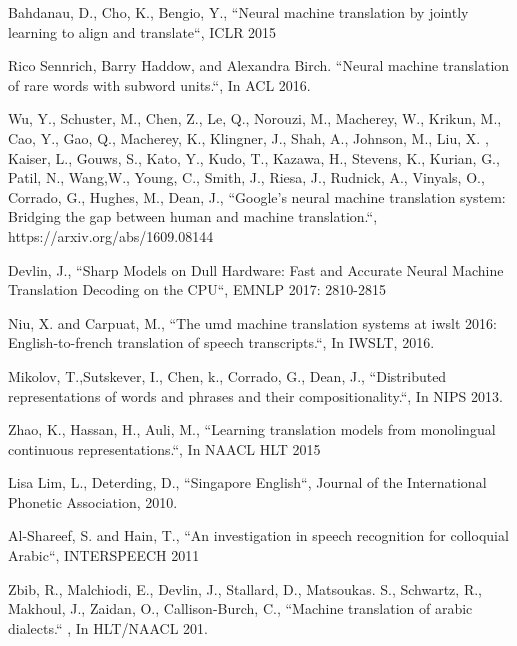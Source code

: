 \documentclass[a4paper]{article}
\begin{document}

\begin{thebibliography}{30}

 Bahdanau, D., Cho, K., Bengio, Y.,  ``Neural machine translation by jointly learning to align and
  translate``, ICLR 2015

Rico Sennrich, Barry Haddow, and Alexandra Birch.
``Neural machine translation of rare words with subword units.``,
 In ACL 2016.

 Wu, Y., Schuster, M., Chen, Z., Le, Q., Norouzi, M., Macherey, W., Krikun, M., Cao, Y., Gao, Q., Macherey, K., Klingner, J.,
  Shah, A.,  Johnson, M., Liu, X. , Kaiser, L.,  Gouws, S.,
   Kato, Y., Kudo, T., Kazawa, H., Stevens, K., Kurian, G., Patil, N., Wang,W., Young, C., Smith, J., Riesa, J., Rudnick, A.,
   Vinyals, O., Corrado, G., Hughes, M.,  Dean, J.,
 ``Google's neural machine translation system: Bridging the gap between
  human and machine translation.``, https://arxiv.org/abs/1609.08144

Devlin, J., 	``Sharp Models on Dull Hardware: Fast and Accurate Neural Machine Translation Decoding on the CPU``, EMNLP 2017: 2810-2815

 Niu, X. and Carpuat, M.,
``The umd machine translation systems at iwslt 2016: English-to-french
  translation of speech transcripts.``, In  IWSLT, 2016.

 Mikolov, T.,Sutskever, I., Chen, k., Corrado, G.,  Dean, J.,
  ``Distributed representations of words and phrases and their
  compositionality.``, In  NIPS 2013. 


 Zhao, K., Hassan, H., Auli, M., 
``Learning translation models from monolingual continuous representations.``, In NAACL HLT 2015

Lisa Lim, L., Deterding, D., ``Singapore English``,   Journal of the International Phonetic Association, 2010.

  Al{-}Shareef, S. and Hain, T.,  ``An investigation in speech recognition for colloquial Arabic``, INTERSPEECH 2011


 Zbib, R., Malchiodi, E., Devlin, J., Stallard, D.,  Matsoukas. S., Schwartz, R., Makhoul, J., Zaidan, O.,  Callison{-}Burch, C., ``Machine translation of arabic dialects.``
, In HLT/NAACL 201.


\end{thebibliography}
\end{document}

